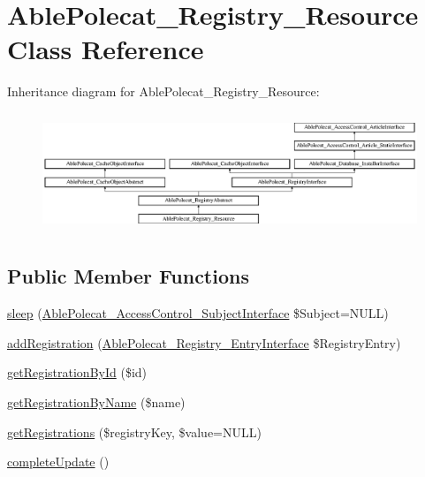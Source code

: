 \hypertarget{class_able_polecat___registry___resource}{}\section{Able\+Polecat\+\_\+\+Registry\+\_\+\+Resource Class Reference}
\label{class_able_polecat___registry___resource}
Inheritance diagram for Able\+Polecat\+\_\+\+Registry\+\_\+\+Resource\+:\begin{figure}[H]
\begin{center}
\leavevmode
\includegraphics[height=3.612903cm]{class_able_polecat___registry___resource}
\end{center}
\end{figure}
\subsection*{Public Member Functions}
\begin{DoxyCompactItemize}
\item 
\hyperlink{class_able_polecat___registry___resource_a365e24d7b066205cafa2a5cce3a4f224}{sleep} (\hyperlink{interface_able_polecat___access_control___subject_interface}{Able\+Polecat\+\_\+\+Access\+Control\+\_\+\+Subject\+Interface} \$Subject=N\+U\+L\+L)
\item 
\hyperlink{class_able_polecat___registry___resource_a22d8ddb551ccf544f1d2615db68ca9b1}{add\+Registration} (\hyperlink{interface_able_polecat___registry___entry_interface}{Able\+Polecat\+\_\+\+Registry\+\_\+\+Entry\+Interface} \$Registry\+Entry)
\item 
\hyperlink{class_able_polecat___registry___resource_a06a999816a4143bb407c09628018a874}{get\+Registration\+By\+Id} (\$id)
\item 
\hyperlink{class_able_polecat___registry___resource_a11594a43c95ab62b4841717c17cf0e54}{get\+Registration\+By\+Name} (\$name)
\item 
\hyperlink{class_able_polecat___registry___resource_a8ed45a29bdb30603896e12d7bbf208b5}{get\+Registrations} (\$registry\+Key, \$value=N\+U\+L\+L)
\item 
\hyperlink{class_able_polecat___registry___resource_a363ee22699ad46520333ef24f64798bb}{complete\+Update} ()
\end{DoxyCompactItemize}

